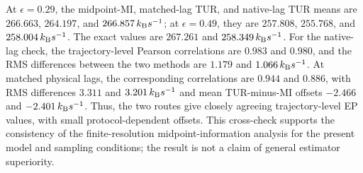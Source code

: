 At $\epsilon=0.29$, the midpoint-MI, matched-lag TUR, and native-lag TUR means are $266.663$, $264.197$, and $266.857\,k_{\rm B}s^{-1}$; at $\epsilon=0.49$, they are $257.808$, $255.768$, and $258.004\,k_{\rm B}s^{-1}$. The exact values are $267.261$ and $258.349\,k_{\rm B}s^{-1}$. For the native-lag check, the trajectory-level Pearson correlations are $0.983$ and $0.980$, and the RMS differences between the two methods are $1.179$ and $1.066\,k_{\rm B}s^{-1}$. At matched physical lags, the corresponding correlations are $0.944$ and $0.886$, with RMS differences $3.311$ and $3.201\,k_{\rm B}s^{-1}$ and mean TUR-minus-MI offsets $-2.466$ and $-2.401\,k_{\rm B}s^{-1}$. Thus, the two routes give closely agreeing trajectory-level EP values, with small protocol-dependent offsets. This cross-check supports the consistency of the finite-resolution midpoint-information analysis for the present model and sampling conditions; the result is not a claim of general estimator superiority.
